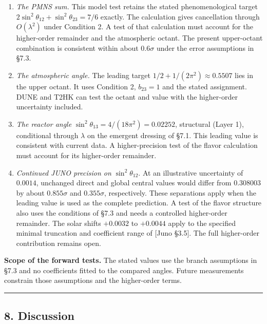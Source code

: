 \documentclass[
]{article}
\providecommand{\tightlist}{%
  \setlength{\itemsep}{0pt}\setlength{\parskip}{0pt}}
\begin{document}
\begin{enumerate}
\def\labelenumi{\arabic{enumi}.}
\tightlist
\item
  \emph{The PMNS sum.} This model test retains the stated
  phenomenological target \(2\sin^2\theta_{12}+\sin^2\theta_{23}=7/6\)
  exactly. The calculation gives cancellation through \(O(\lambda^2)\)
  under Condition 2. A test of that calculation must account for the
  higher-order remainder and the atmospheric octant. The present
  upper-octant combination is consistent within about \(0.6\sigma\)
  under the error assumptions in §7.3.
\item
  \emph{The atmospheric angle.} The leading target
  \(1/2+1/(2\pi^2)\approx0.5507\) lies in the upper octant. It uses
  Condition 2, \(b_{23}=1\) and the stated assignment. DUNE and T2HK can
  test the octant and value with the higher-order uncertainty included.
\item
  \emph{The reactor angle}
  \(\sin^2\theta_{13} = 4/(18\pi^2) = 0.02252\), structural (Layer 1),
  conditional through \(\lambda\) on the emergent dressing of §7.1. This
  leading value is consistent with current data. A higher-precision test
  of the flavor calculation must account for its higher-order remainder.
\item
  \emph{Continued JUNO precision on} \(\sin^2\theta_{12}\). At an
  illustrative uncertainty of \(0.0014\), unchanged direct and global
  central values would differ from \(0.308003\) by about \(0.855\sigma\)
  and \(0.355\sigma\), respectively. These separations apply when the
  leading value is used as the complete prediction. A test of the flavor
  structure also uses the conditions of §7.3 and needs a controlled
  higher-order remainder. The solar shifts \(+0.0032\) to \(+0.0044\)
  apply to the specified minimal truncation and coefficient range of
  {[}Juno §3.5{]}. The full higher-order contribution remains open.
\end{enumerate}

\textbf{Scope of the forward tests.} The stated values use the branch
assumptions in §7.3 and no coefficients fitted to the compared angles.
Future measurements constrain those assumptions and the higher-order
terms.

\begin{center}\rule{0.5\linewidth}{0.5pt}\end{center}

\hypertarget{discussion}{%
\subsection{8. Discussion}\label{discussion}}
\end{document}
